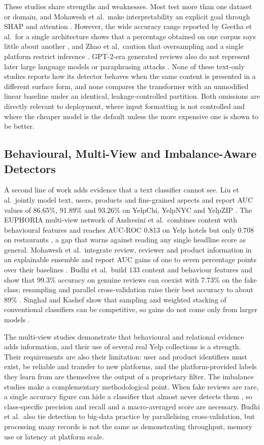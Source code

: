 These studies share strengths and weaknesses. Most test more than one dataset or domain, and Mohawesh et al.\ make interpretability an explicit goal through SHAP and attention \cite{ref15}. However, the wide accuracy range reported by Geetha et al.\ for a single architecture shows that a percentage obtained on one corpus says little about another \cite{ref6}, and Zhao et al.\ caution that oversampling and a single platform restrict inference \cite{ref20}. GPT-2-era generated reviews also do not represent later large language models or paraphrasing attacks \cite{ref17}. None of these text-only studies reports how its detector behaves when the same content is presented in a different surface form, and none compares the transformer with an unmodified linear baseline under an identical, leakage-controlled partition. Both omissions are directly relevant to deployment, where input formatting is not controlled and where the cheaper model is the default unless the more expensive one is shown to be better.

\subsection{Behavioural, Multi-View and Imbalance-Aware Detectors}
A second line of work adds evidence that a text classifier cannot see. Liu et al.\ jointly model text, users, products and fine-grained aspects and report AUC values of 86.65\%, 91.89\% and 93.26\% on YelpChi, YelpNYC and YelpZIP \cite{ref10}. The EUPHORIA multi-view network of Andresini et al.\ combines content with behavioural features and reaches AUC-ROC 0.813 on Yelp hotels but only 0.708 on restaurants \cite{ref1}, a gap that warns against reading any single headline score as general. Mohawesh et al.\ integrate review, reviewer and product information in an explainable ensemble and report AUC gains of one to seven percentage points over their baselines \cite{ref14}. Budhi et al.\ build 133 content and behaviour features and show that 99.3\% accuracy on genuine reviews can coexist with 7.73\% on the fake class; resampling and parallel cross-validation raise their best accuracy to about 89\% \cite{ref2}. Singhal and Kashef show that sampling and weighted stacking of conventional classifiers can be competitive, so gains do not come only from larger models \cite{ref18}.

The multi-view studies demonstrate that behavioural and relational evidence adds information, and their use of several real Yelp collections is a strength. Their requirements are also their limitation: user and product identifiers must exist, be reliable and transfer to new platforms, and the platform-provided labels they learn from are themselves the output of a proprietary filter. The imbalance studies make a complementary methodological point. When fake reviews are rare, a single accuracy figure can hide a classifier that almost never detects them \cite{ref2}, so class-specific precision and recall and a macro-averaged score are necessary. Budhi et al.\ also tie detection to big-data practice by parallelising cross-validation, but processing many records is not the same as demonstrating throughput, memory use or latency at platform scale.

